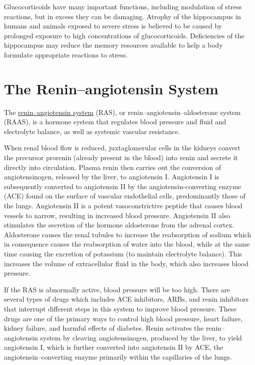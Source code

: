 Glucocorticoids have many important functions, including modulation of stress reactions, but in excess they can be damaging. Atrophy of the hippocampus in humans and animals exposed to severe stress is believed to be caused by prolonged exposure to high concentrations of glucocorticoids. Deficiencies of the hippocampus may reduce the memory resources available to help a body formulate appropriate reactions to stress.

\hypertarget{the-reninangiotensin-system}{%
\section{The Renin--angiotensin System}\label{the-reninangiotensin-system}}

The \href{https://en.wikipedia.org/wiki/Renin–angiotensin_system}{renin--angiotensin system} (RAS), or renin--angiotensin--aldosterone system (RAAS), is a hormone system that regulates blood pressure and fluid and electrolyte balance, as well as systemic vascular resistance.

When renal blood flow is reduced, juxtaglomerular cells in the kidneys convert the precursor prorenin (already present in the blood) into renin and secrete it directly into circulation. Plasma renin then carries out the conversion of angiotensinogen, released by the liver, to angiotensin I. Angiotensin I is subsequently converted to angiotensin II by the angiotensin-converting enzyme (ACE) found on the surface of vascular endothelial cells, predominantly those of the lungs. Angiotensin II is a potent vasoconstrictive peptide that causes blood vessels to narrow, resulting in increased blood pressure. Angiotensin II also stimulates the secretion of the hormone aldosterone from the adrenal cortex. Aldosterone causes the renal tubules to increase the reabsorption of sodium which in consequence causes the reabsorption of water into the blood, while at the same time causing the excretion of potassium (to maintain electrolyte balance). This increases the volume of extracellular fluid in the body, which also increases blood pressure.

If the RAS is abnormally active, blood pressure will be too high. There are several types of drugs which includes ACE inhibitors, ARBs, and renin inhibitors that interrupt different steps in this system to improve blood pressure. These drugs are one of the primary ways to control high blood pressure, heart failure, kidney failure, and harmful effects of diabetes. Renin activates the renin--angiotensin system by cleaving angiotensinogen, produced by the liver, to yield angiotensin I, which is further converted into angiotensin II by ACE, the angiotensin--converting enzyme primarily within the capillaries of the lungs.



